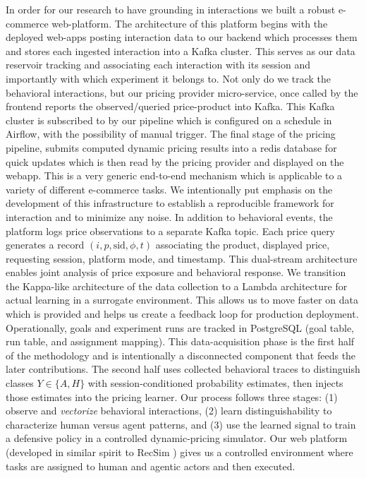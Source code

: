 \documentclass[10pt,letterpaper]{article}
\begin{document}
\vspace{0.5em}
In order for our research to have grounding in interactions we built a robust e-commerce web-platform.
The architecture of this platform begins with the deployed web-apps posting interaction data to our backend which processes them and stores each ingested interaction into a Kafka cluster.
This serves as our data reservoir tracking and associating each interaction with its session and importantly with which experiment it belongs to.
Not only do we track the behavioral interactions, but our pricing provider micro-service, once called by the frontend reports the observed/queried price-product into Kafka.
This Kafka cluster is subscribed to by our pipeline which is configured on a schedule in Airflow, with the possibility of manual trigger.
The final stage of the pricing pipeline, submits computed dynamic pricing results into a redis database for quick updates which is then read by the pricing provider and displayed on the webapp.
This is a very generic end-to-end mechanism which is applicable to a variety of different e-commerce tasks.
We intentionally put emphasis on the development of this infrastructure to establish a reproducible framework for interaction and to minimize any noise.
In addition to behavioral events, the platform logs price observations to a separate Kafka topic.
Each price query generates a record $(i, p, \text{sid}, \phi, t)$ associating the product, displayed price, requesting session, platform mode, and timestamp.
This dual-stream architecture enables joint analysis of price exposure and behavioral response.
We transition the Kappa-like architecture of the data collection to a Lambda architecture for actual learning in a surrogate environment.
This allows us to move faster on data which is provided and helps us create a feedback loop for production deployment.
Operationally, goals and experiment runs are tracked in PostgreSQL (goal table, run table, and assignment mapping).
This data-acquisition phase is the first half of the methodology and is intentionally a disconnected component that feeds the later contributions.
The second half uses collected behavioral traces to distinguish classes $Y \in \{A,H\}$ with session-conditioned probability estimates, then injects those estimates into the pricing learner.
Our process follows three stages: (1) observe and \textit{vectorize} behavioral interactions, (2) learn distinguishability to characterize human versus agent patterns, and (3) use the learned signal to train a defensive policy in a controlled dynamic-pricing simulator.
Our web platform (developed in similar spirit to RecSim \parencite{ie_recsim_2019}) gives us a controlled environment where tasks are assigned to human and agentic actors and then executed.
\end{document}
